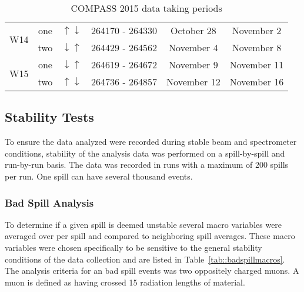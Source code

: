 \begin{table}[h!t]
\begin{tabular}{ |c|c|c|c|c|c| }
    \multirow{2}{2em}{W14}& one& $\uparrow \downarrow$& 264170 - 264330&
    October 28& November 2 \\ & two& $\downarrow \uparrow$& 264429 - 264562&
    November 4& November 8 \\ \hline

    \multirow{2}{2em}{W15}& one& $\downarrow \uparrow$& 264619 - 264672&
    November 9& November 11 \\ & two& $\uparrow \downarrow$& 264736 - 264857&
    November 12& November 16 \\ \hline
    
  \end{tabular}
  \caption{COMPASS 2015 data taking periods}
  \label{tab::datataking}
\end{table}

\subsection{Stability Tests} \label{sec::stability}
To ensure the data analyzed were recorded during stable beam and spectrometer
conditions, stability of the analysis data was performed on a spill-by-spill and
run-by-run basis.  The data was recorded in runs with a maximum of 200 spills
per run.  One spill can have several thousand events.

\subsubsection{Bad Spill Analysis} To determine if a given spill is deemed
unstable several macro variables were averaged over per spill and compared to
neighboring spill averages.  These macro variables were chosen specifically to
be sensitive to the general stability conditions of the data collection and are
listed in Table~\ref{tab::badspillmacros}.  The analysis criteria for an bad
spill events was two oppositely charged muons.  A muon is defined as having
crossed 15 radiation lengths of material.

